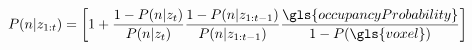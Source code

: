 \begin{equation}\label{eq:octomap}
  P(n|z_{1:t}) = \biggl[ 1 + \frac{1-P(n|z_t)}{P(n|z_{t})} 
                              \frac{1-P(n|z_{1:t-1})}{P(n|z_{1:t-1})}
                              \frac{\gls{occupancyProbability}}{1-P(\gls{voxel})}
  \biggr]
\end{equation}

